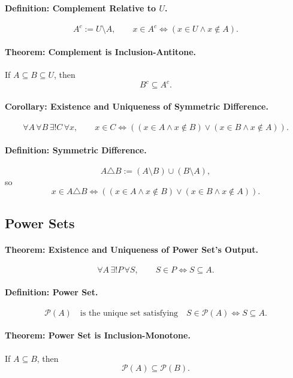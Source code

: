 \paragraph{Definition: Complement Relative to \(U\).}
\[
  A^c:=U\setminus A,
  \qquad
  x\in A^c
  \Longleftrightarrow
  (x\in U\land x\notin A).
\]

\paragraph{Theorem: Complement is Inclusion-Antitone.}
If \(A\subseteq B\subseteq U\), then
\[
  B^c\subseteq A^c.
\]

\paragraph{Corollary: Existence and Uniqueness of Symmetric Difference.}
\[
  \forall A\,\forall B\,\exists!C\,\forall x,\qquad
  x\in C
  \Longleftrightarrow
  ((x\in A\land x\notin B)\lor(x\in B\land x\notin A)).
\]

\paragraph{Definition: Symmetric Difference.}
\[
  A\triangle B:=(A\setminus B)\cup(B\setminus A),
\]
so
\[
  x\in A\triangle B
  \Longleftrightarrow
  ((x\in A\land x\notin B)\lor(x\in B\land x\notin A)).
\]

\subsection*{Power Sets}

\paragraph{Theorem: Existence and Uniqueness of Power Set's Output.}
\[
  \forall A\,\exists!P\,\forall S,\qquad
  S\in P\Longleftrightarrow S\subseteq A.
\]

\paragraph{Definition: Power Set.}
\[
  \mathcal P(A)
  \quad\text{is the unique set satisfying}\quad
  S\in\mathcal P(A)\Longleftrightarrow S\subseteq A.
\]

\paragraph{Theorem: Power Set is Inclusion-Monotone.}
If \(A\subseteq B\), then
\[
  \mathcal P(A)\subseteq\mathcal P(B).
\]

